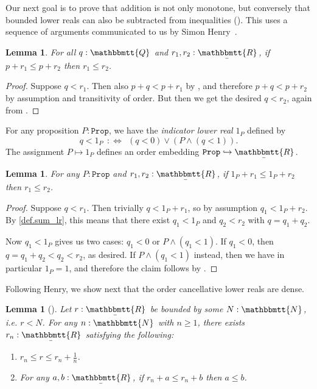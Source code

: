 \documentclass[reqno,11pt]{amsproc}
\theoremstyle{plain}
\newtheorem{lemma}[theorem]{Lemma}
\theoremstyle{definition}
\newcommand{\Const}[1]{\mathtt{#1}}
\newcommand{\ubar}[1]{\underaccent{\bar}{#1}}
\newcommand{\ind}[1]{1_{#1}}			%
\newcommand{\internal}[1]{\raisebox{-.03ex}{$\mathbbmtt{#1}$}}
\newcommand{\hs}{\hspace{1pt}}
\newcommand{\tnn}{\internal{N}\hs}
\newcommand{\tqq}{\internal{Q}\hs}
\newcommand{\trr}{\internal{R}}
\newcommand{\tlrr}{\ubar{\trr}\hs}
\newcommand{\prop}{\Const{Prop}}
\renewcommand{\iff}{\Leftrightarrow}
\numberwithin{equation}{section}
\begin{document}
Our next goal is to prove that addition is not only monotone, but conversely that bounded lower reals can also be subtracted from inequalities (). This uses a sequence of arguments communicated to us by Simon Henry~\cite{henry2012simplification}.

\begin{lemma}
	\label{cancel_rationals}
	For all $q:\tqq$ and $r_1,r_2:\tlrr$, if $p + r_1\leq p + r_2$ then $r_1 \leq r_2$.
\end{lemma}

\begin{proof}
	Suppose $q < r_1$. Then also $p + q < p + r_1$ by , and therefore $p + q < p + r_2$ by assumption and transitivity of order. But then we get the desired $q < r_2$, again from .
\end{proof}

For any proposition $P : \prop$, we have the \emph{indicator lower real} $\ind{P}$ defined by
\[
	q < 1_P \:\::\iff\:\: (q < 0) \lor (P \land (q < 1)).
\]
The assignment $P \mapsto \ind{P}$ defines an order embedding $\prop \hookrightarrow \tlrr$.

\begin{lemma}\label{order_cancel_props}
For any $P:\prop$ and $r_1,r_2:\tlrr$, if $\ind{P}+r_1\leq \ind{P}+r_2$ then $r_1\leq r_2$.
\end{lemma}

\begin{proof}
Suppose $q < r_1$. Then trivially $q < \ind{P} + r_1$, so by assumption $q_1<\ind{P}+r_2$. By \cref{def.sum_lr}, this means that there exist $q_1 < \ind{P}$ and $q_2 < r_2$ with $q = q_1 + q_2$.

Now $q_1 < \ind{P}$ gives us two cases: $q_1 < 0$ or $P \land (q_1 < 1)$. If $q_1 < 0$, then $q = q_1 + q_2 < q_2 < r_2$, as desired. If $P \land (q_1 < 1)$ instead, then we have in particular $1_P = 1$, and therefore the claim follows by .
\end{proof}

Following Henry, we show next that the order cancellative lower reals are dense.

\begin{lemma}[\cite{henry2012simplification}]
\label{cancellative_bounds}
	Let $r:\tlrr$ be bounded by some $N:\tnn$, i.e. $r<N$. For any $n:\tnn$ with $n\geq 1$, there exists $r_n:\tlrr$ satisfying the following:
	\begin{enumerate}
		\item $r_n\leq r\leq r_n + \frac{1}{n}$.
		\item For any $a,b:\tlrr$, if $r_n+a\leq r_n+b$ then $a\leq b$.
	\end{enumerate}
\end{lemma}
\end{document}
